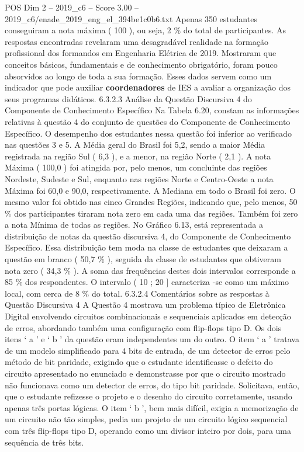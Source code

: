 \begin{textsample}{POS Dim 2 – 2019\_c6 – Score 3.00 – 2019\_c6/enade\_2019\_eng\_el\_394be1c0b6.txt}
Apenas 350 estudantes conseguiram a nota máxima ( 100 ), ou seja, 2 \% do total de participantes.
As respostas encontradas revelaram uma desagradável realidade na formação profissional dos formandos em Engenharia Elétrica de 2019.
Mostraram que conceitos básicos, fundamentais e de conhecimento obrigatório, foram pouco absorvidos ao longo de toda a sua formação.
Esses dados servem como um indicador que pode auxiliar \textbf{coordenadores} de IES a avaliar a organização dos seus programas didáticos. 6.3.2.3 Análise da Questão Discursiva 4 do Componente de Conhecimento Específico Na Tabela 6.20, constam as informações relativas à questão 4 do conjunto de questões do Componente de Conhecimento Específico.
O desempenho dos estudantes nessa questão foi inferior ao verificado nas questões 3 e 5.
A Média geral do Brasil foi 5,2, sendo a maior Média registrada na região Sul ( 6,3 ), e a menor, na região Norte ( 2,1 ).
A nota Máxima ( 100,0 ) foi atingida por, pelo menos, um concluinte das regiões Nordeste, Sudeste e Sul, enquanto nas regiões Norte e Centro-Oeste a nota Máxima foi 60,0 e 90,0, respectivamente.
A Mediana em todo o Brasil foi zero.
O mesmo valor foi obtido nas cinco Grandes Regiões, indicando que, pelo menos, 50 \% dos participantes tiraram nota zero em cada uma das regiões.
Também foi zero a nota Mínima de todas as regiões.
No Gráfico 6.13, está representada a distribuição de notas da questão discursiva 4, do Componente de Conhecimento Específico.
Essa distribuição tem moda na classe de estudantes que deixaram a questão em branco ( 50,7 \% ), seguida da classe de estudantes que obtiveram nota zero ( 34,3 \% ).
A soma das frequências destes dois intervalos corresponde a 85 \% dos respondentes.
O intervalo ( 10 ; 20 ] caracteriza -se como um máximo local, com cerca de 8 \% do total. 6.3.2.4 Comentários sobre as respostas à Questão Discursiva 4 A Questão 4 mostrava um problema típico de Eletrônica Digital envolvendo circuitos combinacionais e sequenciais aplicados em detecção de erros, abordando também uma configuração com flip-flops tipo D.
Os dois itens ‘ a ’ e ‘ b ’ da questão eram independentes um do outro.
O item ‘ a ’ tratava de um modelo simplificado para 4 bits de entrada, de um detector de erros pelo método de bit paridade, exigindo que o estudante identificasse o defeito do circuito apresentado no enunciado e demonstrasse por que o circuito mostrado não funcionava como um detector de erros, do tipo bit paridade.
Solicitava, então, que o estudante refizesse o projeto e o desenho do circuito corretamente, usando apenas três portas lógicas.
O item ‘ b ’, bem mais difícil, exigia a memorização de um circuito não tão simples, pedia um projeto de um circuito lógico sequencial com três flip-flops tipo D, operando como um divisor inteiro por dois, para uma sequência de três bits.

\end{textsample}
